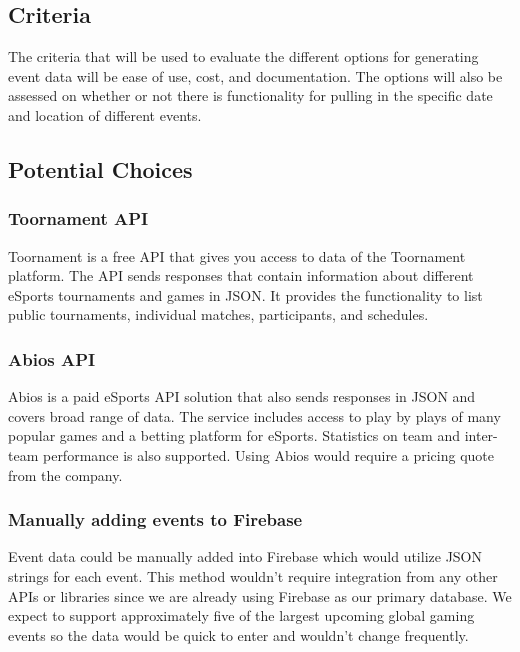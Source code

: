 \documentclass[onecolumn, draftclsnofoot,10pt, compsoc]{IEEEtran}
\begin{document}
\subsection{Criteria}
The criteria that will be used to evaluate the different options for generating event data will be ease of use, cost, and documentation. 
The options will also be assessed on whether or not there is functionality for pulling in the specific date and location of different events. 
\subsection{Potential Choices}
\subsubsection{Toornament API\cite{toornament}}
Toornament is a free API that gives you access to data of the Toornament platform.
The API sends responses that contain information about different eSports tournaments and games in JSON.
It provides the functionality to list public tournaments, individual matches, participants, and schedules. 
\subsubsection{Abios API\cite{abios}}
Abios is a paid eSports API solution that also sends responses in JSON and covers broad range of data. 
The service includes access to play by plays of many popular games and a betting platform for eSports.
Statistics on team and inter-team performance is also supported. 
Using Abios would require a pricing quote from the company.
\subsubsection{Manually adding events to Firebase\cite{fb}}
Event data could be manually added into Firebase which would utilize JSON strings for each event.
This method wouldn't require integration from any other APIs or libraries since we are already using Firebase as our primary database.
We expect to support approximately five of the largest upcoming global gaming events so the data would be quick to enter and wouldn't change frequently. 
\end{document}
